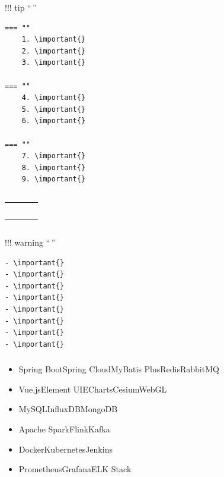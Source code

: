 !!! tip ``\,''

\begin{verbatim}
=== ""
    1. \important{}
    2. \important{}
    3. \important{}
    
=== ""
    4. \important{}
    5. \important{}
    6. \important{}
    
=== ""
    7. \important{}
    8. \important{}
    9. \important{}
\end{verbatim}

\hypertarget{section-6}{%
\subsection{}\label{section-6}}

\begin{longtable}[]{@{}llll@{}}
\toprule\noalign{}
\endhead
\bottomrule\noalign{}
\endlastfoot
& & & \\
& & & \\
& & & \\
& & & \\
& & & \\
\end{longtable}

\hypertarget{section-7}{%
\subsection{}\label{section-7}}

!!! warning ``\,''

\begin{verbatim}
- \important{}
- \important{}
- \important{}
- \important{}
- \important{}
- \important{}
- \important{}
- \important{}
\end{verbatim}

\hypertarget{section-8}{%
\subsubsection{}\label{section-8}}

\begin{itemize}
\tightlist
\item
  \important{}Spring BootSpring CloudMyBatis PlusRedisRabbitMQ
\item
  \important{}Vue.jsElement UIEChartsCesiumWebGL
\item
  \important{}MySQLInfluxDBMongoDB
\item
  \important{}Apache SparkFlinkKafka
\item
  \important{}DockerKubernetesJenkins
\item
  \important{}PrometheusGrafanaELK Stack
\end{itemize}

